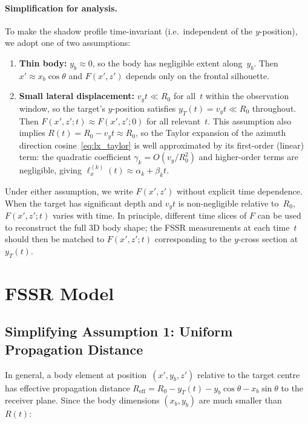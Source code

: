 \documentclass[11pt,a4paper]{article}
\begin{document}
\paragraph{Simplification for analysis.}
To make the shadow profile time-invariant (i.e.\ independent of the
$y$-position), we adopt one of two assumptions:
\begin{enumerate}
  \item[(a)] \textbf{Thin body:} $y_b\approx 0$, so the body has
    negligible extent along~$y_b$.  Then $x'\approx x_b\cos\theta$
    and $F(x',z')$ depends only on the frontal silhouette.
  \item[(b)] \textbf{Small lateral displacement:}
    $v_y t\ll R_0$ for all~$t$ within the observation window,
    so the target's $y$-position satisfies $y_T(t)=v_y t\ll R_0$
    throughout.  Then $F(x',z';t)\approx F(x',z';0)$ for all
    relevant~$t$.  This assumption also implies $R(t)=R_0-v_y t
    \approx R_0$, so the Taylor expansion of the azimuth direction
    cosine~\eqref{eq:lx_taylor} is well approximated by its
    first-order (linear) term: the quadratic coefficient
    $\gamma_k=O(v_y/R_0^2)$ and higher-order terms are negligible,
    giving $\ell_x^{(k)}(t)\approx\alpha_k+\beta_k t$.
\end{enumerate}
Under either assumption, we write $F(x',z')$ without explicit
time dependence.  When the target has significant depth and
$v_y t$ is non-negligible relative to~$R_0$, $F(x',z';t)$ varies
with time.  In principle, different time slices of $F$ can be used to
reconstruct the full 3D body shape; the FSSR measurements at each
time~$t$ should then be matched to $F(x',z';t)$ corresponding to
the $y$-cross section at $y_T(t)$.

\section{FSSR Model}
\label{sec:fssr}

\subsection{Simplifying Assumption 1: Uniform Propagation Distance}
\label{sec:assumption1}

In general, a body element at position~$(x',y_b,z')$ relative to
the target centre has effective propagation distance
$R_{\mathrm{eff}}=R_0-y_T(t)-y_b\cos\theta-x_b\sin\theta$ to the
receiver plane.  Since the body dimensions $(x_b,y_b)$ are much
smaller than~$R(t)$:
\end{document}
